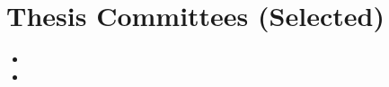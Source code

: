 \documentclass[12pt]{article}
\begin{document}
\section*{Thesis Committees (Selected)}

\begin{itemize}
  \item {}
  \item {}
\end{itemize}

\end{document}
